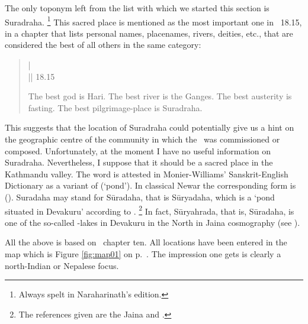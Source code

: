 The only toponym left from the list with which
we started this section is Suradraha.%
	\footnote{Always spelt  in Naraharinath's
			edition.}
This sacred place is mentioned as the most important
one in \VSS\ 18.15, in a chapter that lists personal names,
placenames, rivers, deities, etc., that are considered the
best  of all others in the same category:

\begin{quote}
 |\\
 || 18.15 

The best god is Hari. The best river is the Ganges.
The best austerity is fasting. The best pilgrimage-place is Suradraha.
\end{quote}

\noindent
This suggests that the location of Suradraha could potentially
give us a hint on the geographic centre of 
the community in which the \VSS\ was commissioned
or composed. Unfortunately, at the moment I have 
no useful information on Suradraha. Nevertheless,
I suppose that it should be  a sacred place in the 
Kathmandu valley. The word  is attested in
Monier-Williams' Sanskrit-English Dictionary 
as a variant of  (`pond').
In classical Newar the corresponding form is 
(). Suradaha may stand for Sūradaha,
that is Sūryadaha, which is a `pond situated in Devakuru' 
according to .%
	\footnote{The references given are the Jaina 
			 and .} 
In fact, Sūryahrada, that is, Sūradaha, is one of the 
so-called -lakes in Devakuru in the North
in Jaina cosmography (see ).
 
All the above is based on \VSS\ chapter ten. All locations have
 been entered in the map which is Figure \ref{fig:map01} on
 p.~\pageref{fig:map01}.
 The impression one gets is clearly a north-Indian or
 Nepalese focus.
 
